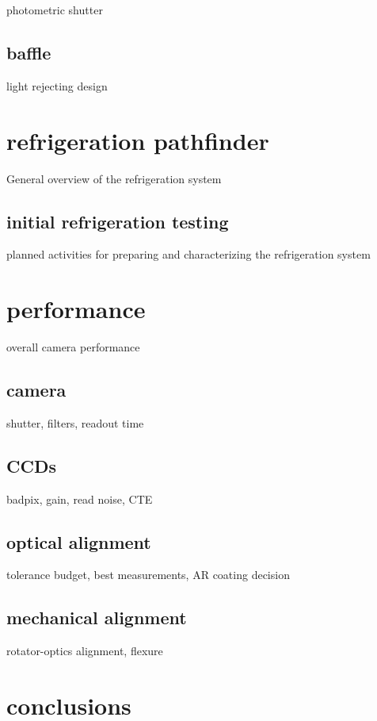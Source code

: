 \documentclass[modern]{aastex62}
\begin{document}
photometric shutter

\subsection{baffle}

light rejecting design

\section{refrigeration pathfinder}

General overview of the refrigeration system

\subsection{initial refrigeration testing}

planned activities for preparing and characterizing the refrigeration system

\section{performance}

overall camera performance

\subsection{camera}

shutter, filters, readout time

\subsection{CCDs}

badpix, gain, read noise, CTE

\subsection{optical alignment}

tolerance budget, best measurements, AR coating decision

\subsection{mechanical alignment}

rotator-optics alignment, flexure

\section{conclusions}
\end{document}
